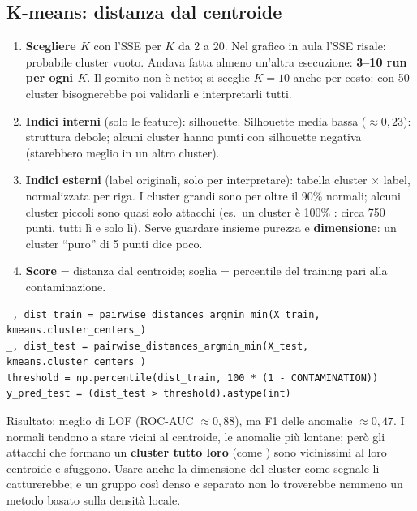 \subsection{K-means: distanza dal centroide}
\begin{enumerate}
  \item \textbf{Scegliere $K$} con l'SSE per $K$ da 2 a 20. Nel grafico in aula l'SSE risale: probabile cluster vuoto. Andava fatta almeno
        un'altra esecuzione: \textbf{3--10 run per ogni $K$}. Il gomito non è netto; si sceglie $K=10$ anche per costo: con 50 cluster
        bisognerebbe poi validarli e interpretarli tutti.
  \item \textbf{Indici interni} (solo le feature): silhouette. Silhouette media bassa ($\approx 0{,}23$): struttura debole; alcuni
        cluster hanno punti con silhouette negativa (starebbero meglio in un altro cluster).
  \item \textbf{Indici esterni} (label originali, solo per interpretare): tabella cluster $\times$ label, normalizzata per riga. I cluster
        grandi sono per oltre il 90\% normali; alcuni cluster piccoli sono quasi solo attacchi (es.\ un cluster è 100\% :
        circa 750 punti, tutti lì e solo lì). Serve guardare insieme purezza e \textbf{dimensione}: un cluster ``puro'' di 5 punti dice poco.
  \item \textbf{Score} = distanza dal centroide; soglia = percentile del training pari alla contaminazione.
\end{enumerate}
\begin{lstlisting}
_, dist_train = pairwise_distances_argmin_min(X_train, kmeans.cluster_centers_)
_, dist_test = pairwise_distances_argmin_min(X_test, kmeans.cluster_centers_)
threshold = np.percentile(dist_train, 100 * (1 - CONTAMINATION))
y_pred_test = (dist_test > threshold).astype(int)
\end{lstlisting}
Risultato: meglio di LOF (ROC-AUC $\approx 0{,}88$), ma F1 delle anomalie $\approx 0{,}47$. I normali tendono a stare vicini al centroide,
le anomalie più lontane; però gli attacchi che formano un \textbf{cluster tutto loro} (come ) sono vicinissimi al loro
centroide e sfuggono. Usare anche la dimensione del cluster come segnale li catturerebbe; e un gruppo così denso e separato non lo
troverebbe nemmeno un metodo basato sulla densità locale.


